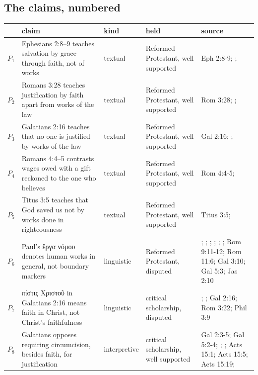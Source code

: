 \documentclass[11pt]{article}
\begin{document}
\subsection*{The claims, numbered}
\begin{longtable}{@{}r >{\raggedright\arraybackslash}p{} l >{\raggedright\arraybackslash}p{} >{\raggedright\arraybackslash}p{}@{}}
\toprule
 & claim & kind & held & source \\
\midrule
\endhead
$P_{1}$ & Ephesians 2:8–9 teaches salvation by grace through faith, not of works & textual & Reformed Protestant, well supported & Eph 2:8-9; \cite[III.xi.7]{calvin-institutes-1960}; \cite[ad loc. Eph 2:9]{lincoln-ephesians-1990} \\
$P_{2}$ & Romans 3:28 teaches justification by faith apart from works of the law & textual & Reformed Protestant, well supported & Rom 3:28; \cite[III.xi.19]{calvin-institutes-1960}; \cite[ad loc. Rom 3:28]{fitzmyer-romans-1993} \\
$P_{3}$ & Galatians 2:16 teaches that no one is justified by works of the law & textual & Reformed Protestant, well supported & Gal 2:16; \cite[III.xi.19]{calvin-institutes-1960}; \cite[ad loc. Gal 2:16]{martyn-galatians-1997} \\
$P_{4}$ & Romans 4:4–5 contrasts wages owed with a gift reckoned to the one who believes & textual & Reformed Protestant, well supported & Rom 4:4-5; \cite[III.xi.18]{calvin-institutes-1960} \\
$P_{5}$ & Titus 3:5 teaches that God saved us not by works done in righteousness & textual & Reformed Protestant, well supported & Titus 3:5; \cite[III.xiv.5]{calvin-institutes-1960} \\
$P_{6}$ & Paul's ἔργα νόμου denotes human works in general, not boundary markers & linguistic & Reformed Protestant, disputed & \cite[III.xi.19]{calvin-institutes-1960}; \cite{westerholm-perspectives-2003}; \cite{das-paul-law-covenant-2001}; \cite{gathercole-where-boasting-2002}; \cite{carson-variegated-nomism-1-2001}; \cite{piper-future-justification-2007}; Rom 9:11-12; Rom 11:6; Gal 3:10; Gal 5:3; Jas 2:10 \\
$P_{7}$ & πίστις Χριστοῦ in Galatians 2:16 means faith in Christ, not Christ's faithfulness & linguistic & critical scholarship, disputed & \cite{dunn-once-more-pistis-christou-1991}; \cite{matlock-detheologizing-2000}; Gal 2:16; Rom 3:22; Phil 3:9 \\
$P_{8}$ & Galatians opposes requiring circumcision, besides faith, for justification & interpretive & critical scholarship, well supported & Gal 2:3-5; Gal 5:2-4; \cite[ad loc. Gal 5:2]{martyn-galatians-1997}; \cite[ad loc. Gal 5:2]{moo-galatians-2013}; Acts 15:1; Acts 15:5; Acts 15:19; \cite[ad loc. Acts 15:1]{bruce-acts-1988} \\

\end{longtable}
\end{document}
